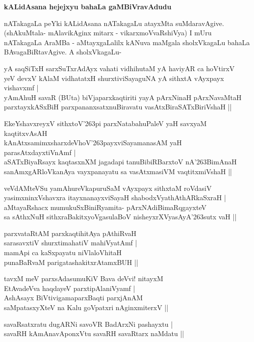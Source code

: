 {\bigskip
\noindent
{\large\bf kALidAsana hejejxyu bahaLa gaMBiVravAdudu}}\label{page243}
\medskip

\noindent
nATakagaLa peYki kALidAsana nATakagaLu atayxMta suMdaravAgive. (shAkuMtala- mAlavikAginx mitarx - vikarxmoVvaRshiVya) I mUru nATakagaLa AraMBa - aMtayxgaLalilx kANuva maMgala sholxVkagaLu bahaLa BAvagaBiRtavAgive. A sholxVkagaLu-

\begin{itemize}
{\bf
\item[(1)] yA saqSiTxH sarxSuTxrAdAyx vahati vidhihutaM yA haviyAR ca hoVtirxV \\\label{243}
yeV devxV kAlaM vidhatatxH shurxtiviSayaguNA yA sithxtA vAyxpayx vishavxmf |\\
yAmAhuH savaR (BUta) biVjaparxkaqtiriti yayA pArxNinaH pArxNavaMtaH \\
parxtayxkASxBiH parxpananxsatxnuBiravatu vasAtxBiraSATxBiriVshaH ||
\item[(2)] EkeYshavxreyxV sithxtoV\char'263pi parxNatabahuPaleV yaH savxyaM kaqtitxvAsAH \\\label{243a}
kAnAtxsamimxsharxdeVhoV\char'263payxviSayamanasAM yaH parasAtxdayxtiVnAmf |\\
aSATxBiyaRsayx kaqtasxnXM jagadapi tanuBibiRBarxtoV nA\char'263BimAnaH\\
sanAmxgARloVkanAya vayxpanayatu sa vasAtxmasiVM vaqtitxmiVshaH ||
\item[(3)] veVdAMteVSu yamAhureVkapuruSaM vAyxpayx sithxtaM roVdasiV\\\label{243b}
yasimxninxVshavxra itayxnanayxviSayaH shabodxVyathAthARkaSxraH |\\
aMtayaRshacx mumukuSxBiniRyamita- pArxNAdiBimaRqgayxteV \\
sa sAthxNuH sithxraBakitxyoVgasulaBoV nisheyxrXVyasAyA\char'263sutx vaH ||}

\begin{itemize}
{\bf
\item[(1)] parxvataRtAM parxkaqtihitAya pAthiRvaH\\\label{243c}
sarasavxtiV shurxtimahatiV mahiVyatAmf |\\
mamApi ca kaSxpayatu niVlaloVhitaH \\
punaBaRvaM parigatashakitxrAtamxBUH ||
\item[(2)] tavxM meV parxsAdasumuKiV Bava deVvi! nitayxM\\\label{244}
EtAvadeVva haqdayeV parxtipAlaniVyamf |\\
AshAsayx BiVtivigamaparxBaqti parxjAnAM \\
saMpatasxyXteV na Kalu goVpatxri nAginxmiterxV ||
\item[(3)] savaRsatxratu dugARNi savoVR BadArxNi pashayxtu |\\\label{244a}
savaRH kAmAnavAponxVtu savaRH savaRtarx naMdatu ||}
\end{itemize}
\end{itemize}

